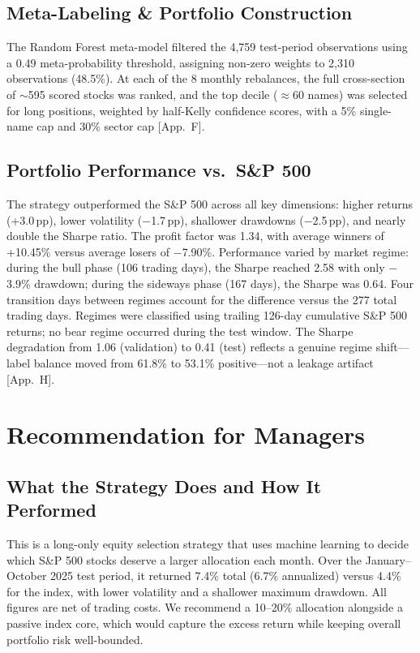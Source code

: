 \documentclass[11pt, a4paper]{article}
\begin{document}
\subsection{Meta-Labeling \& Portfolio Construction}
The Random Forest meta-model filtered the 4,759 test-period observations using a 0.49 meta-probability threshold, assigning non-zero weights to 2,310 observations (48.5\%). At each of the 8 monthly rebalances, the full cross-section of $\sim$595 scored stocks was ranked, and the top decile ($\approx$60 names) was selected for long positions, weighted by half-Kelly confidence scores, with a 5\% single-name cap and 30\% sector cap [App.\ F].

\subsection{Portfolio Performance vs.\ S\&P 500}
The strategy outperformed the S\&P 500 across all key dimensions: higher returns (+3.0\,pp), lower volatility ($-$1.7\,pp), shallower drawdowns ($-$2.5\,pp), and nearly double the Sharpe ratio. The profit factor was 1.34, with average winners of +10.45\% versus average losers of $-$7.90\%. Performance varied by market regime: during the bull phase (106 trading days), the Sharpe reached 2.58 with only $-$3.9\% drawdown; during the sideways phase (167 days), the Sharpe was 0.64. Four transition days between regimes account for the difference versus the 277 total trading days. Regimes were classified using trailing 126-day cumulative S\&P 500 returns; no bear regime occurred during the test window. The Sharpe degradation from 1.06 (validation) to 0.41 (test) reflects a genuine regime shift---label balance moved from 61.8\% to 53.1\% positive---not a leakage artifact [App.\ H].

\section{Recommendation for Managers}

\subsection{What the Strategy Does and How It Performed}
This is a long-only equity selection strategy that uses machine learning to decide which S\&P 500 stocks deserve a larger allocation each month. Over the January--October 2025 test period, it returned 7.4\% total (6.7\% annualized) versus 4.4\% for the index, with lower volatility and a shallower maximum drawdown. All figures are net of trading costs. We recommend a 10--20\% allocation alongside a passive index core, which would capture the excess return while keeping overall portfolio risk well-bounded.
\end{document}
